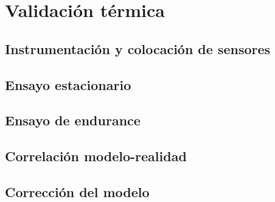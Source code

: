 \chapter{Validación térmica}
\label{ch:validacion_termica}

\begin{objetivos}
  \item {}
  \item {}
  \item {}
\end{objetivos}


\section{Instrumentación y colocación de sensores}
\label{sec:validacion_termica:01}

\section{Ensayo estacionario}
\label{sec:validacion_termica:02}

\section{Ensayo de endurance}
\label{sec:validacion_termica:03}

\section{Correlación modelo-realidad}
\label{sec:validacion_termica:04}

\section{Corrección del modelo}
\label{sec:validacion_termica:05}


